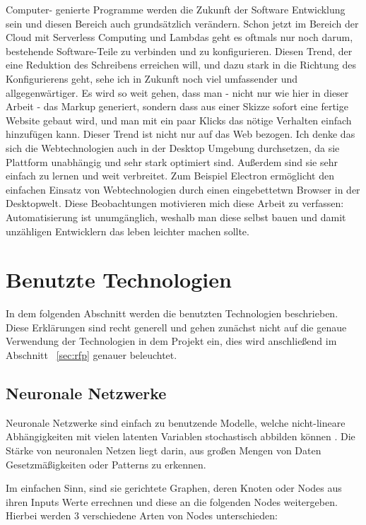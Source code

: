 \documentclass[pdftex,a4paper,halfparskip, article]{scrartcl}
\begin{document}
Computer- genierte Programme werden die Zukunft der Software Entwicklung sein und diesen Bereich auch grundsätzlich verändern. Schon jetzt im Bereich der Cloud mit Serverless Computing und Lambdas geht es oftmals nur noch darum, bestehende Software-Teile zu verbinden und zu konfigurieren. Diesen Trend, der eine Reduktion des Schreibens erreichen will, und dazu stark in die Richtung des Konfigurierens geht, sehe ich in Zukunft noch viel umfassender und allgegenwärtiger. Es wird so weit gehen, dass man - nicht nur wie hier in dieser Arbeit - das Markup generiert, sondern dass aus einer Skizze sofort eine fertige Website gebaut wird, und man mit ein paar Klicks das nötige Verhalten einfach hinzufügen kann. 
Dieser Trend ist nicht nur auf das Web bezogen. Ich denke das sich die Webtechnologien auch in der Desktop Umgebung durchsetzen,  da sie Plattform unabhängig und sehr stark optimiert sind. Außerdem sind sie sehr einfach zu lernen und weit verbreitet. Zum Beispiel Electron \cite{electron} ermöglicht den einfachen Einsatz von Webtechnologien durch einen eingebettetwn Browser in der Desktopwelt.
Diese Beobachtungen motivieren mich diese Arbeit zu verfassen: Automatisierung ist unumgänglich, weshalb man diese selbst bauen und damit unzähligen Entwicklern das leben leichter machen sollte.

\newpage
\section{Benutzte Technologien}


In dem folgenden Abschnitt werden die benutzten Technologien beschrieben. Diese Erklärungen sind recht generell und gehen zunächst nicht auf die genaue Verwendung der Technologien in dem Projekt ein, dies wird anschließend im Abschnitt ~\ref{sec:rfp} genauer beleuchtet.

\subsection{Neuronale Netzwerke}
Neuronale Netzwerke sind einfach zu benutzende Modelle, welche nicht-lineare Abhängigkeiten mit vielen latenten Variablen stochastisch abbilden können \cite{nnWebsite}. Die Stärke von neuronalen Netzen liegt darin, aus großen Mengen von Daten Gesetzmäßigkeiten oder Patterns zu erkennen. 

Im einfachen Sinn, sind sie gerichtete Graphen, deren Knoten oder Nodes aus ihren Inputs Werte errechnen und diese an die folgenden Nodes weitergeben. Hierbei werden 3 verschiedene Arten von Nodes unterschieden:
\end{document}
